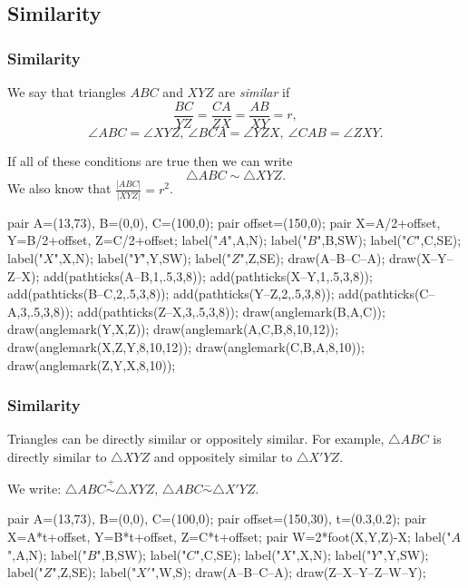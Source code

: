 \documentclass{beamer}
\begin{document}
  \subsection{Similarity}
    \begin{frame}[fragile]
      \frametitle{Similarity}
      We say that triangles $ABC$ and $XYZ$ are \emph{similar} if
      $$\frac{BC}{YZ}=\frac{CA}{ZX}=\frac{AB}{XY}=r,$$
      $$\angle ABC=\angle XYZ,\
      \angle BCA=\angle YZX,\ \angle CAB=\angle ZXY.$$

      If all of these conditions are true then we can write $$\triangle
      ABC\sim\triangle XYZ.$$ We also know that $\frac{|ABC|}{|XYZ|}=r^2$.

      \begin{center}
        \begin{asy}
          pair A=(13,73), B=(0,0), C=(100,0);
          pair offset=(150,0);
          pair X=A/2+offset, Y=B/2+offset, Z=C/2+offset;
          label("$A$",A,N);
          label("$B$",B,SW);
          label("$C$",C,SE);
          label("$X$",X,N);
          label("$Y$",Y,SW);
          label("$Z$",Z,SE);
          draw(A--B--C--A);
          draw(X--Y--Z--X);
          add(pathticks(A--B,1,.5,3,8));
          add(pathticks(X--Y,1,.5,3,8));
          add(pathticks(B--C,2,.5,3,8));
          add(pathticks(Y--Z,2,.5,3,8));
          add(pathticks(C--A,3,.5,3,8));
          add(pathticks(Z--X,3,.5,3,8));
          draw(anglemark(B,A,C));
          draw(anglemark(Y,X,Z));
          draw(anglemark(A,C,B,8,10,12));
          draw(anglemark(X,Z,Y,8,10,12));
          draw(anglemark(C,B,A,8,10));
          draw(anglemark(Z,Y,X,8,10));
        \end{asy}
      \end{center}
    \end{frame}
    \begin{frame}[fragile]
      \frametitle{Similarity}
      Triangles can be directly similar or oppositely similar. For example,
      $\triangle ABC$ is directly similar to $\triangle XYZ$ and oppositely
      similar to $\triangle X'YZ$.

      We write: $\triangle ABC\overset +\sim\triangle XYZ$, $\triangle
      ABC\overset -\sim\triangle X'YZ$.

      \begin{center}
        \begin{asy}
          pair A=(13,73), B=(0,0), C=(100,0);
          pair offset=(150,30), t=(0.3,0.2);
          pair X=A*t+offset, Y=B*t+offset, Z=C*t+offset;
          pair W=2*foot(X,Y,Z)-X;
          label("$A$",A,N);
          label("$B$",B,SW);
          label("$C$",C,SE);
          label("$X$",X,N);
          label("$Y$",Y,SW);
          label("$Z$",Z,SE);
          label("$X'$",W,S);
          draw(A--B--C--A);
          draw(Z--X--Y--Z--W--Y);
        \end{asy}
      \end{center}
    \end{frame}
\end{document}
